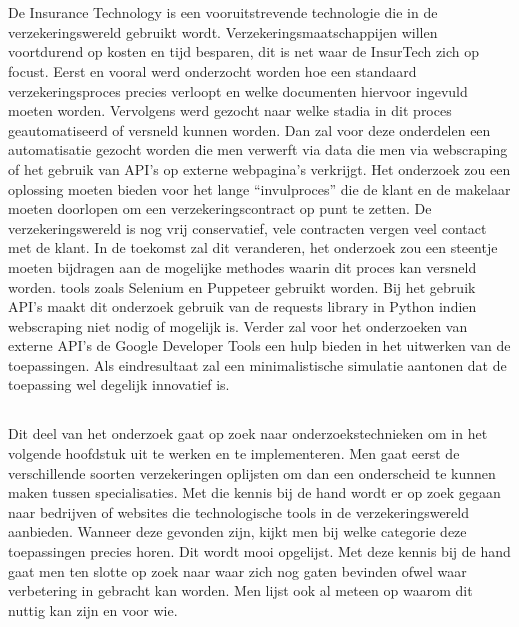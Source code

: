 
\chapter{}
\label{ch:voorbereiding-onderzoek}

De Insurance Technology is een vooruitstrevende technologie die in de verzekeringswereld gebruikt wordt. Verzekeringsmaatschappijen willen voortdurend op kosten en tijd besparen, dit is net waar de InsurTech zich op focust. Eerst en vooral werd onderzocht worden hoe een standaard verzekeringsproces precies verloopt en welke documenten hiervoor ingevuld moeten worden. Vervolgens werd gezocht naar welke stadia in dit proces geautomatiseerd of versneld kunnen worden. Dan zal voor deze onderdelen een automatisatie gezocht worden die men verwerft via data die men via webscraping of het gebruik van API’s op externe webpagina’s verkrijgt. Het onderzoek zou een oplossing moeten bieden voor het lange “invulproces” die de klant en de makelaar moeten doorlopen om een verzekeringscontract op punt te zetten. De verzekeringswereld is nog vrij conservatief, vele contracten vergen veel contact met de klant. In de toekomst zal dit veranderen, het onderzoek zou een steentje moeten bijdragen aan de mogelijke methodes waarin dit proces kan versneld worden. tools zoals Selenium en Puppeteer gebruikt worden. Bij het gebruik API’s maakt dit onderzoek gebruik van de requests library in Python indien webscraping niet nodig of mogelijk is. Verder zal voor het onderzoeken van externe API’s de Google Developer Tools een hulp bieden in het uitwerken van de toepassingen. Als eindresultaat zal een minimalistische simulatie aantonen dat de toepassing wel degelijk innovatief is.

\section{}
\label{sec:inleiding}

Dit deel van het onderzoek gaat op zoek naar onderzoekstechnieken om in het volgende hoofdstuk uit te werken en te implementeren.
Men gaat eerst de verschillende soorten verzekeringen oplijsten om dan een onderscheid te kunnen maken tussen specialisaties.
Met die kennis bij de hand wordt er op zoek gegaan naar bedrijven of websites die technologische tools in de verzekeringswereld aanbieden. Wanneer deze gevonden zijn, kijkt men bij welke categorie deze toepassingen precies horen. Dit wordt mooi opgelijst. 
Met deze kennis bij de hand gaat men ten slotte op zoek naar waar zich nog gaten bevinden ofwel waar verbetering in gebracht kan worden. Men lijst ook al meteen op waarom dit nuttig kan zijn en voor wie.

